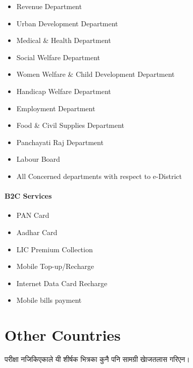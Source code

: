 \begin{multicols}{2}
	\begin{itemize}
		\item Revenue Department
		\item Urban Development Department
		\item Medical \& Health Department
		\item Social Welfare Department
		\item Women Welfare \& Child Development Department
		\item Handicap Welfare Department
		\item Employment Department
		\item Food \& Civil Supplies Department
		\item Panchayati Raj Department
		\item Labour Board
		\item All Concerned departments with respect to e-District
	\end{itemize}
\end{multicols}


\paragraph*{B2C Services}
\begin{multicols}{2}
	\begin{itemize}
		\item PAN Card
		\item Aadhar Card
		\item LIC Premium Collection
		\item Mobile Top-up/Recharge
		\item Internet Data Card Recharge
		\item Mobile bills payment
	\end{itemize}
\end{multicols}


\section{Other Countries}
\begin{framed}
	\begin{center}
		\begin{nepali}
			परीक्षा नजिकिएकाले यी शीर्षक भित्रका कुनै पनि सामग्री खाेजतलास गरिएन।
		\end{nepali}
	\end{center}
\end{framed}


